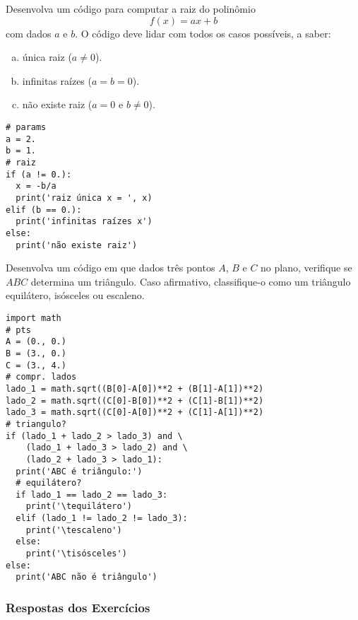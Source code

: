 \begin{exer}
  Desenvolva um código para computar a raiz do polinômio
  \begin{equation}
    f(x) = ax + b
  \end{equation}
  com dados $a$ e $b$. O código deve lidar com todos os casos possíveis, a saber:
  \begin{enumerate}[a)]
    \item única raiz ($a\neq 0$).
    \item infinitas raízes ($a=b=0$).
    \item não existe raiz ($a = 0$ e $b \neq 0$).
  \end{enumerate}
\end{exer}
\begin{resp}

\begin{lstlisting}
# params
a = 2.
b = 1.
# raiz
if (a != 0.):
  x = -b/a
  print('raiz única x = ', x)
elif (b == 0.):
  print('infinitas raízes x')
else:
  print('não existe raiz')
\end{lstlisting}

\end{resp}

\begin{exer}
  Desenvolva um código em que dados três pontos $A$, $B$ e $C$ no plano, verifique se $ABC$ determina um triângulo. Caso afirmativo, classifique-o como um triângulo equilátero, isósceles ou escaleno.
\end{exer}
\begin{resp}

\begin{lstlisting}
import math
# pts
A = (0., 0.)
B = (3., 0.)
C = (3., 4.)
# compr. lados
lado_1 = math.sqrt((B[0]-A[0])**2 + (B[1]-A[1])**2)
lado_2 = math.sqrt((C[0]-B[0])**2 + (C[1]-B[1])**2)
lado_3 = math.sqrt((C[0]-A[0])**2 + (C[1]-A[1])**2)
# triangulo?
if (lado_1 + lado_2 > lado_3) and \
    (lado_1 + lado_3 > lado_2) and \
    (lado_2 + lado_3 > lado_1):
  print('ABC é triângulo:')
  # equilátero?
  if lado_1 == lado_2 == lado_3:
    print('\tequilátero')
  elif (lado_1 != lado_2 != lado_3):
    print('\tescaleno')
  else:
    print('\tisósceles')
else:
  print('ABC não é triângulo')
\end{lstlisting}

\end{resp}

\ifisbook 
\subsubsection*{Respostas dos Exercícios}
\shipoutAnswer
\fi

